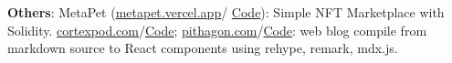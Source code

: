 \cvspace

\begin{onecolentry}
	\textbf{Others}: MetaPet (\href{https://metapet.vercel.app}{metapet.vercel.app}/ \href{https://github.com/hmthanh/metapet}{Code}): Simple NFT Marketplace with Solidity.  \href{https://cortexpod.com}{cortexpod.com}/\href{https://github.com/cortexpod/cortexpod.github.io}{Code};  \href{https://pithagon.com}{pithagon.com}/\href{https://github.com/pithagon/pithagon.github.io}{Code}: web blog compile from markdown source to React components using rehype, remark, mdx.js.
\end{onecolentry}

%        
%
%
%                
